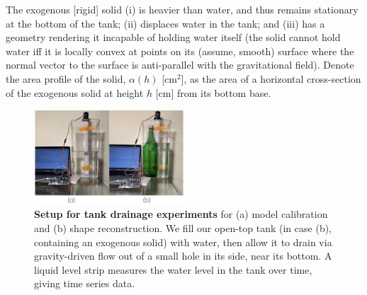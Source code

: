 \documentclass[a4paper,fleqn]{cas-dc}
\begin{document}
The exogenous [rigid] solid (i) is heavier than water, and thus remains stationary at the bottom of the tank; (ii) displaces water in the tank; and (iii) has a geometry rendering it incapable of holding water itself (the solid cannot hold water iff it is locally convex at points on its (assume, smooth) surface where the normal vector to the surface is anti-parallel with the gravitational field). Denote the area profile of the solid, $\alpha(h)$ [cm$^2$], as the area of a horizontal cross-section of the exogenous solid at height $h$ [cm] from its bottom base.


\begin{figure}[h!]
\begin{center}
	\includegraphics[width=0.5\textwidth]{real_expt.png}
	\caption{\textbf{Setup for tank drainage experiments} for (a) model calibration and (b) shape reconstruction.
	We fill our open-top tank (in case (b), containing an exogenous solid) with water, then allow it to drain via gravity-driven flow out of a small hole in its side, near its bottom. A liquid level strip measures the water level in the tank over time, giving time series data.
	}
	\label{fig:photo_of_tank}
\end{center}
\end{figure}
\end{document}
